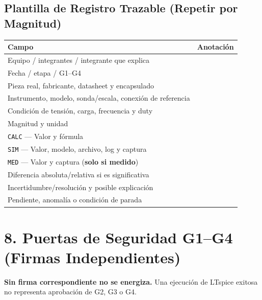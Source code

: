 \documentclass[10pt, a4paper, landscape]{article}
\begin{document}
\subsection*{Plantilla de Registro Trazable (Repetir por Magnitud)}
\par\vspace{0.08cm}\noindent
\renewcommand{\arraystretch}{1.28}
{\small
\begin{tabularx}{\linewidth}{|>{\raggedright\arraybackslash}p{7.8cm}|>{\raggedright\arraybackslash}X|}
\hline
\rowcolor{ucbgray}
\textbf{Campo} & \textbf{Anotación} \\ \hline
Equipo / integrantes / integrante que explica & \\ \hline
Fecha / etapa / G1--G4 & \\ \hline
Pieza real, fabricante, datasheet y encapsulado & \\ \hline
Instrumento, modelo, sonda/escala, conexión de referencia & \\ \hline
Condición de tensión, carga, frecuencia y duty & \\ \hline
Magnitud y unidad & \\ \hline
\texttt{CALC} — Valor y fórmula & \\ \hline
\texttt{SIM} — Valor, modelo, archivo, log y captura & \\ \hline
\texttt{MED} — Valor y captura (\textbf{solo si medido}) & \\ \hline
Diferencia absoluta/relativa si es significativa & \\ \hline
Incertidumbre/resolución y posible explicación & \\ \hline
Pendiente, anomalía o condición de parada & \\ \hline
\end{tabularx}
}

\newpage
\section*{8. Puertas de Seguridad G1--G4 (Firmas Independientes)}
\textbf{\textcolor{warnred}{Sin firma correspondiente no se energiza.}} Una ejecución de LTspice exitosa no representa aprobación de G2, G3 o G4.
\end{document}
